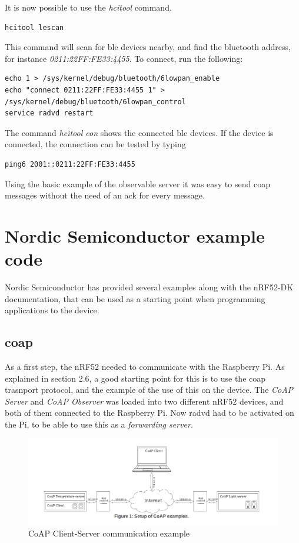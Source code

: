 It is now possible to use the \textit{hcitool} command. 

\begin{verbatim}
hcitool lescan
\end{verbatim}

This command will scan for \gls{ble} devices nearby, and find the bluetooth address, for instance \textit{0211:22FF:FE33:4455}. To connect, run the following: 

\begin{verbatim}
echo 1 > /sys/kernel/debug/bluetooth/6lowpan_enable
echo "connect 0211:22FF:FE33:4455 1" > /sys/kernel/debug/bluetooth/6lowpan_control
service radvd restart
\end{verbatim}

The command \textit{hcitool con} shows the connected \gls{ble} devices. If the device is connected, the connection can be tested by typing

\begin{verbatim}
ping6 2001::0211:22FF:FE33:4455
\end{verbatim}


Using the basic example of the observable server it was easy to send \gls{coap} messages without the need of an \gls{ack} for every message. 


\section{Nordic Semiconductor example code}

Nordic Semiconductor has provided several examples along with the nRF52-DK documentation, that can be used as a starting point when programming applications to the device. 

\subsection{\gls{coap}}

As a first step, the nRF52 needed to communicate with the Raspberry Pi. As explained in section 2.6, a good starting point for this is to use the \gls{coap} trasnport protocol, and the example of the use of this on the device. The \textit{CoAP Server} and \textit{CoAP Observer} was loaded into two different nRF52 devices, and both of them connected to the Raspberry Pi. Now \gls{radvd} had to be activated on the Pi, to be able to use this as a \textit{forwarding server}. 

\begin{figure}[h]
    \centering
    \includegraphics[scale=0.47]{CoAPExample.png}    
    \caption{CoAP Client-Server communication example}
    \label{fig:CoAPexample1}
\end{figure}

